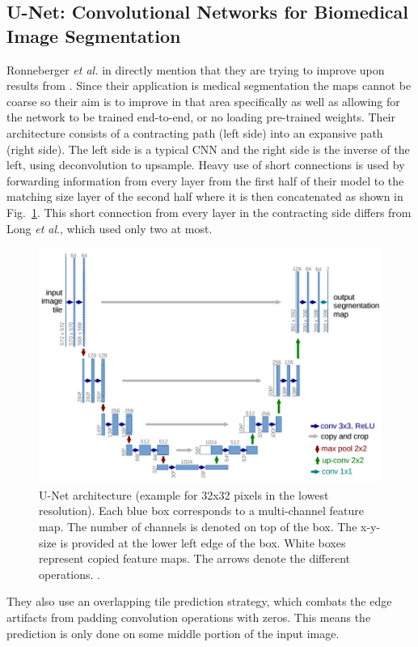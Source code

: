 \subsection{U-Net: Convolutional Networks for Biomedical Image Segmentation}\label{s:unet}
Ronneberger \textit{et al.} in \cite{ronneberger2015u} directly mention that they are trying to improve upon results from \cite{long2015fully}. Since their application is medical segmentation the maps cannot be coarse so their aim is to improve in that area specifically as well as allowing for the network to be trained end-to-end, or no loading pre-trained weights. Their architecture consists of a contracting path (left side) into an expansive path (right side). The left side is a typical CNN and the right side is the inverse of the left, using deconvolution to upsample. Heavy use of short connections is used by forwarding information from every layer from the first half of their model to the matching size layer of the second half where it is then concatenated as shown in Fig.~\ref{f:unet}. This short connection from every layer in the contracting side differs from Long \textit{et al}., which used only two at most.
\begin{figure}[h!]
	\centering
		\includegraphics[width=1.0\textwidth]{figures/unet.png}
	\caption{U-Net architecture (example for 32x32 pixels in the lowest resolution). Each blue box corresponds to a multi-channel feature map. The number of channels is denoted on top of the box. The x-y-size is provided at the lower left edge of the box. White boxes represent copied feature maps. The arrows denote the different operations. \cite{ronneberger2015u}.}
	\label{f:unet}
\end{figure}
They also use an overlapping tile prediction strategy, which combats the edge artifacts from padding convolution operations with zeros. This means the prediction is only done on some middle portion of the input image.  

